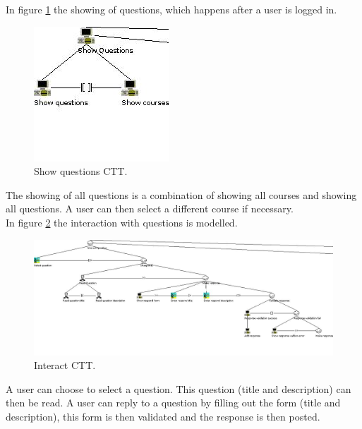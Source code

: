 In figure \ref{fig:ctt2} the showing of questions, which happens after a user is logged in.
\begin{figure}[H]
\centering
\includegraphics[scale=0.6]{../../ctt/ctt2.jpg}
\caption{Show questions CTT.}
\label{fig:ctt2}
\end{figure}
The showing of all questions is a combination of showing all courses and showing all questions. A user can then select a different course if necessary.\\

In figure \ref{fig:ctt3} the interaction with questions is modelled.
\begin{figure}[H]
\centering
\includegraphics[scale=0.3]{../../ctt/ctt3.jpg}
\caption{Interact CTT.}
\label{fig:ctt3}
\end{figure}
A user can choose to select a question. This question (title and description) can then be read. A user can reply to a question by filling out the form (title and description), this form is then validated and the response is then posted. \\


